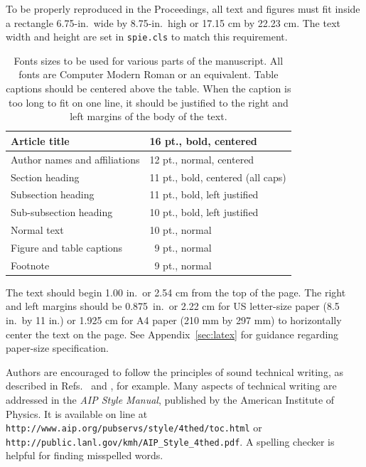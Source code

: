 \documentclass[]{spie}  %
\begin{document}
To be properly reproduced in the Proceedings, all text and figures must fit inside a rectangle 6.75-in.\ wide by 8.75-in.\ high or 17.15 cm by 22.23 cm.  The text width and height are set in {\tt spie.cls} to match this requirement.
\begin{table}[h]
\caption{Fonts sizes to be used for various parts of the manuscript.  All fonts are Computer Modern Roman or an equivalent.  Table captions should be centered above the table.  When the caption is too long to fit on one line, it should be justified to the right and left margins of the body of the text.} 
\label{tab:fonts}
\begin{center}       
\begin{tabular}{|l|l|} %
\hline
\rule[-1ex]{0pt}{3.5ex}  Article title & 16 pt., bold, centered  \\
\hline
\rule[-1ex]{0pt}{3.5ex}  Author names and affiliations & 12 pt., normal, centered   \\
\hline
\rule[-1ex]{0pt}{3.5ex}  Section heading & 11 pt., bold, centered (all caps)  \\
\hline
\rule[-1ex]{0pt}{3.5ex}  Subsection heading & 11 pt., bold, left justified  \\
\hline
\rule[-1ex]{0pt}{3.5ex}  Sub-subsection heading & 10 pt., bold, left justified  \\
\hline
\rule[-1ex]{0pt}{3.5ex}  Normal text & 10 pt., normal  \\
\hline
\rule[-1ex]{0pt}{3.5ex}  Figure and table captions & \, 9 pt., normal \\
\hline
\rule[-1ex]{0pt}{3.5ex}  Footnote & \, 9 pt., normal \\
\hline 
\end{tabular}
\end{center}
\end{table} 
The text should begin 1.00 in.\ or 2.54 cm from the top of the page.  The right and left margins should be 0.875~in.\ or 2.22 cm for US letter-size paper (8.5 in.\ by 11 in.) or 1.925 cm for A4 paper (210 mm by 297 mm) to horizontally center the text on the page.  See Appendix~\ref{sec:latex} for guidance regarding paper-size specification. 

Authors are encouraged to follow the principles of sound technical writing, as described in Refs.~ and , for example.  Many aspects of technical writing are addressed in the {\em AIP Style Manual}, published by the American Institute of Physics.  It is available on line at {\tt http://www.aip.org/pubservs/style/4thed/toc.html} or {\tt http://public.lanl.gov/kmh/AIP\verb+_+Style\verb+_+4thed.pdf}. A spelling checker is helpful for finding misspelled words. 
\end{document}
